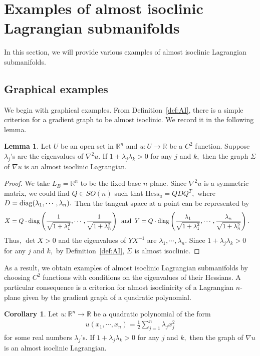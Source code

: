 \documentclass[11pt]{amsart}
\numberwithin{equation}{section}
\theoremstyle{definition}
\theoremstyle{definition}
\newtheorem{cor}[equation]{Corollary}
\newtheorem{lemma}[equation]{Lemma}
\newcommand{\pr}[1]{\left(#1\right)}
\newcommand{\bb}[1]{\mathbb{#1}} \newcommand{\td}[1]{\widetilde{#1}}
\newcommand{\Hess}{\text{Hess}}
\newcommand{\n}{\nabla}
\begin{document}
\section{\bf Examples of almost isoclinic Lagrangian submanifolds}
\label{sec:ex}

In this section, we will provide various examples of almost isoclinic Lagrangian submanifolds. 


\subsection{Graphical examples}


We begin with graphical examples.
From Definition~\ref{def:AI}, there is a simple criterion for a gradient graph to be almost isoclinic.
We record it in the following lemma.

\begin{lemma}
\label{lem:AI-graph}
	Let $U$ be an open set in $\bb R^n$ and $u\colon U\to\bb R$ be a $C^2$ function.
	Suppose $\lambda_j$'s are the eigenvalues of $\n^2 u.$
	If $1+\lambda_j\lambda_k>0$ for any $j$ and $k,$ then the graph $\Sigma$ of $\n u$ is an almost isoclinic Lagrangian.
\end{lemma}

\begin{proof}
	We take $L_B=\bb R^n$ to be the fixed base $n$-plane.
	Since $\n^2 u$ is a symmetric matrix, we could find $Q\in{SO}(n)$ such that $\Hess_u = QDQ^T,$ where $D={\rm diag}(\lambda_1,\cdots,\lambda_n).$
	Then the tangent space at a point can be represented by 
	\begin{align*}
	X &= Q\cdot {\rm diag}\pr{\frac 1{\sqrt{1+\lambda_1^2}}, \cdots, \frac 1{\sqrt{1+\lambda_n^2}}}\,
	\text{ and }\,
	Y =  Q\cdot {\rm diag}\pr{\frac{\lambda_1}{\sqrt{1+\lambda_1^2}}, \cdots, \frac{\lambda_n}{\sqrt{1+\lambda_n^2}}}.
	\end{align*}
	Thus, $\det X>0$ and the eigenvalues of $YX^{-1}$ are
	$\lambda_1,\cdots,\lambda_n.$
	Since $1+\lambda_j\lambda_k>0$ for any $j$ and $k,$ by Definition~\ref{def:AI}, $\Sigma$ is almost isoclinic.	
\end{proof}

As a result, we obtain examples of almost isoclinic Lagrangian submanifolds by choosing $C^2$ functions with conditions on the eigenvalues of their Hessians.
A particular consequence is a criterion for almost isoclinicity of a Lagrangian $n$-plane given by the gradient graph of a quadratic polynomial.

\begin{cor}
	\label{cor:AI-graph}
	Let $u\colon \bb R^n\to\bb R$ be a quadratic polynomial of the form
	\begin{align*}
	u(x_1,\cdots,x_n)
	= \frac 12 \sum_{j=1}^n \lambda_j x_j^2
	\end{align*} 
	for some real numbers $\lambda_j$'s.
	If $1+\lambda_j\lambda_k>0$ for any $j$ and $k,$ then the graph of $\n u$ is an almost isoclinic Lagrangian.
\end{cor}
\end{document}
